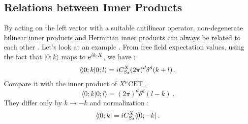 \subsection*{Relations between Inner Products}

By acting on the left vector with a suitable antilinear operator, non-degenerate bilinear inner products and Hermitian inner products can always be related to each other . Let's look at an example . From free field expectation values, using the fact that $|0 ; k\rangle$ maps to $\mathrm{e}^{i k \cdot X}$, we have :
\begin{equation}
	\langle\!\langle 0 ; k \vert 0 ; l\rangle = i C_{S_{2}}^{X}(2 \pi)^{d} \delta^{d}(k+l) \:. \label{6.7.25}
\end{equation}
Compare it with the inner product of $X^{\mu} \mathrm{CFT}$ ,
\begin{equation}
	\langle 0 ; k \vert 0 ; l\rangle=(2 \pi)^{d} \delta^{d}(l-k) \:. \label{6.7.26}
\end{equation}
They differ only by $k \rightarrow-k$ and normalization :
\begin{equation}
	\langle\!\langle 0 ; k \vert = i C_{S_{2}}^{X}\langle\!\langle 0 ;-k| \:. \label{6.7.27}
\end{equation}

